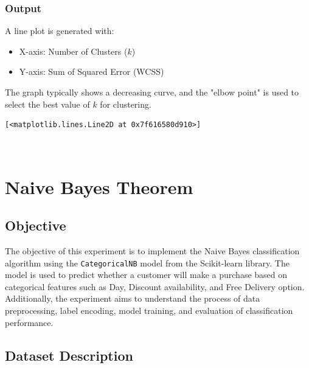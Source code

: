 \documentclass[11pt,a4paper]{report}
\makeatletter
\newcommand{\boxspacing}{\kern\kvtcb@left@rule\kern\kvtcb@boxsep}
\newcommand{\prompt}[4]{
        {\ttfamily\llap{{\color{#2}[#3]:\hspace{3pt}#4}}\vspace{-\baselineskip}}
    }
\makeatother
\begin{document}
\subsection*{Output}
A line plot is generated with:
\begin{itemize}
    \item X-axis: Number of Clusters ($k$)
    \item Y-axis: Sum of Squared Error (WCSS)
\end{itemize}

The graph typically shows a decreasing curve, and the "elbow point" is used to select the best value of $k$ for clustering.
\begin{tcolorbox}[breakable, size=fbox, boxrule=.5pt, pad at break*=1mm, opacityfill=0]
\prompt{Out}{outcolor}{32}{\boxspacing}
\begin{Verbatim}[commandchars=\\\{\}]
[<matplotlib.lines.Line2D at 0x7f616580d910>]
\end{Verbatim}
\end{tcolorbox}
        
    \begin{center}
    \end{center}
    { \hspace*{\fill} \\}
    


\chapter{Naive Bayes Theorem}
\section*{Objective}
The objective of this experiment is to implement the Naive Bayes classification algorithm using the \texttt{CategoricalNB} model from the Scikit-learn library. The model is used to predict whether a customer will make a purchase based on categorical features such as Day, Discount availability, and Free Delivery option. Additionally, the experiment aims to understand the process of data preprocessing, label encoding, model training, and evaluation of classification performance.

\section*{Dataset Description}
\end{document}
